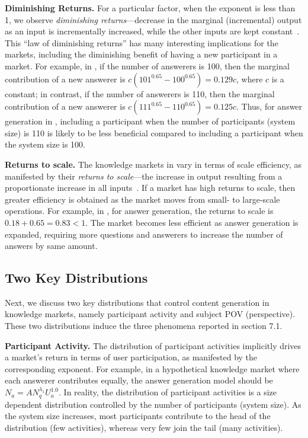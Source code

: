 \textbf{Diminishing Returns.} For a particular factor, when the exponent is less than 1, we observe \emph{diminishing returns}---decrease in the marginal (incremental) output as an input is incrementally increased, while the other inputs are kept constant~\cite{wiki}. This ``law of diminishing returns'' has many interesting implications for the  markets, including the diminishing benefit of having a new participant in a market. For example, in , if the number of answerers is 100, then the marginal contribution of a new answerer is $c(101^{0.65} - 100^{0.65}) = 0.129c$, where $c$ is a constant; in contrast, if the number of answerers is 110, then the marginal contribution of a new answerer is $c(111^{0.65} - 110^{0.65}) = 0.125c$. Thus, for answer generation in , including a participant when the number of participants (system size) is 110 is likely to be less beneficial compared to including a participant when the system size is 100.

\textbf{Returns to scale.} The knowledge markets in  vary in terms of scale efficiency, as manifested by their \emph{returns to scale}---the increase in output resulting from a proportionate increase in all inputs~\cite{wiki}. If a market has high returns to scale, then greater efficiency is obtained as the market moves from small- to large-scale operations. For example, in , for answer generation, the returns to scale is $0.18+0.65=0.83<1$. The market becomes less efficient as answer generation is expanded, requiring more questions and answerers to increase the number of answers by same amount. 

\subsection{Two Key Distributions} 
Next, we discuss two key distributions that control content generation in knowledge markets, namely participant activity and subject POV (perspective). These two distributions induce the three phenomena reported in section 7.1.

\textbf{Participant Activity.} The distribution of participant activities implicitly drives a market's return in terms of user participation, as manifested by the corresponding exponent. For example, in a hypothetical knowledge market where each answerer contributes equally, the answer generation model should be $N_a = AN_q^{\lambda_1}U_a^{1.0}$. In reality, the distribution of participant activities is a size dependent distribution controlled by the number of participants (system size). As the system size increases, most participants contribute to the head of the distribution (few activities), whereas very few join the tail (many activities). 


